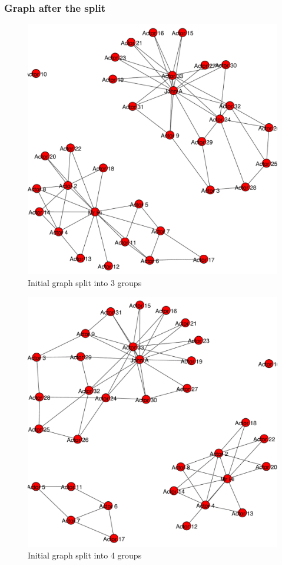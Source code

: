 \documentclass[12pt]{article}
\begin{document}
\subsubsection{Graph after the split}
\begin{figure}[ht]
\includegraphics[scale=0.7]{../qn2/finalgraph3.pdf}
\centering
\caption{Initial graph split into 3 groups}
\label{Initial graph split into 3 groups}
\end{figure}
\newpage

\begin{figure}[ht]
\includegraphics[scale=0.7]{../qn2/finalgraph4.pdf}
\centering
\caption{Initial graph split into 4 groups}
\label{Initial graph split into 4 groups}
\end{figure}
\newpage
\end{document}
